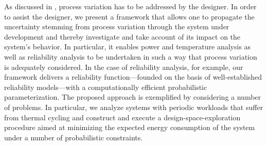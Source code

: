 As discussed in , process variation has to be addressed
by the designer. In order to assist the designer, we present a framework that
allows one to propagate the uncertainty stemming from process variation through
the system under development and thereby investigate and take account of its
impact on the system's behavior. In particular, it enables power and temperature
analysis as well as reliability analysis to be undertaken in such a way that
process variation is adequately considered. In the case of reliability analysis,
for example, our framework delivers a reliability function---founded on the
basis of well-established reliability models---with a computationally efficient
probabilistic parameterization. The proposed approach is exemplified by
considering a number of problems. In particular, we analyze systems with
periodic workloads that suffer from thermal cycling and construct and execute a
design-space-exploration procedure aimed at minimizing the expected energy
consumption of the system under a number of probabilistic constraints.
